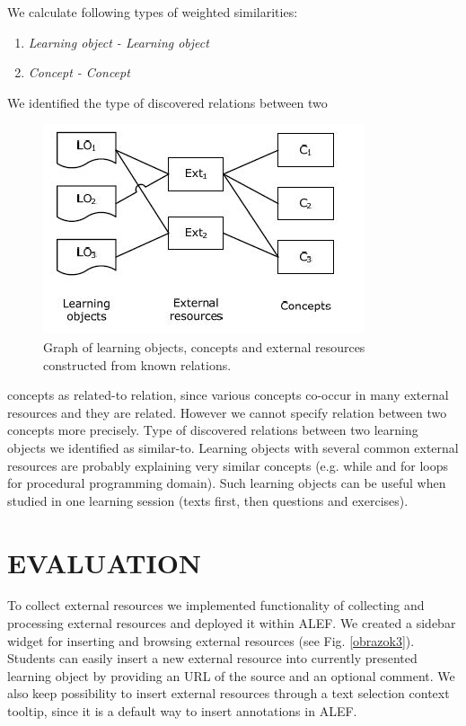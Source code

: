 \documentclass[a4, conference]{IEEEtran}
\begin{document}
We calculate following types of weighted similarities:
\begin{enumerate}
\item \textit{Learning object - Learning object} 
\item \textit{Concept - Concept} 
\end{enumerate}
We identified the type of discovered relations between two
\begin{figure}[H]
\centering
\includegraphics [width=\linewidth]{Figure2.jpg}
\caption{Graph of learning objects, concepts and external resources constructed from known relations.}
\label{obrazok2}
\end{figure}
concepts as related-to relation, since various concepts co-occur in many external resources and they are related. However we cannot specify relation between two concepts more precisely. Type of discovered relations between two learning objects we identified as similar-to. Learning objects with several common external resources are probably explaining very similar concepts (e.g. while and for loops for procedural programming domain). Such learning objects can be useful when studied in one learning session (texts first, then questions and exercises). 
\section{EVALUATION}
%  
To collect external resources we implemented functionality of collecting and processing external resources and deployed it within ALEF. We created a sidebar widget for inserting and browsing external resources (see Fig. \ref{obrazok3}). Students can easily insert a new external resource into currently presented learning object by providing an URL of the source and an optional comment. We also keep possibility to insert external resources through a text selection context tooltip, since it is a default way to insert annotations in ALEF.
\end{document}
